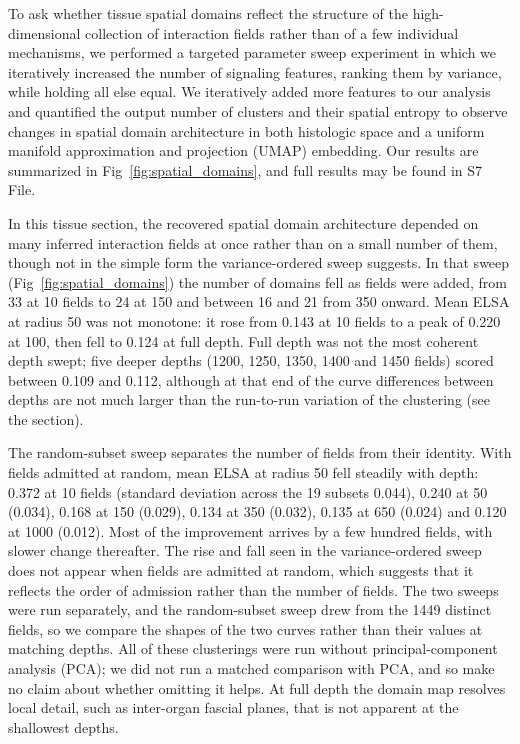\documentclass[10pt,letterpaper]{article}
\begin{document}
To ask whether tissue spatial domains reflect the structure of the high-dimensional collection of interaction fields rather than of a few individual mechanisms, we performed a targeted parameter sweep experiment in which we iteratively increased the number of signaling features, ranking them by variance, while holding all else equal. We iteratively added more features to our analysis and quantified the output number of clusters and their spatial entropy to observe changes in spatial domain architecture in both histologic space and a uniform manifold approximation and projection (UMAP) embedding. Our results are summarized in Fig~\ref{fig:spatial_domains}, and full results may be found in S7 File.

In this tissue section, the recovered spatial domain architecture depended on many inferred interaction fields at once rather than on a small number of them, though not in the simple form the variance-ordered sweep suggests. In that sweep (Fig~\ref{fig:spatial_domains}) the number of domains fell as fields were added, from 33 at 10 fields to 24 at 150 and between 16 and 21 from 350 onward. Mean ELSA at radius 50 was not monotone: it rose from 0.143 at 10 fields to a peak of 0.220 at 100, then fell to 0.124 at full depth. Full depth was not the most coherent depth swept; five deeper depths (1200, 1250, 1350, 1400 and 1450 fields) scored between 0.109 and 0.112, although at that end of the curve differences between depths are not much larger than the run-to-run variation of the clustering (see the  section).

The random-subset sweep separates the number of fields from their identity. With fields admitted at random, mean ELSA at radius 50 fell steadily with depth: 0.372 at 10 fields (standard deviation across the 19 subsets 0.044), 0.240 at 50 (0.034), 0.168 at 150 (0.029), 0.134 at 350 (0.032), 0.135 at 650 (0.024) and 0.120 at 1000 (0.012). Most of the improvement arrives by a few hundred fields, with slower change thereafter. The rise and fall seen in the variance-ordered sweep does not appear when fields are admitted at random, which suggests that it reflects the order of admission rather than the number of fields. The two sweeps were run separately, and the random-subset sweep drew from the 1449 distinct fields, so we compare the shapes of the two curves rather than their values at matching depths. All of these clusterings were run without principal-component analysis (PCA); we did not run a matched comparison with PCA, and so make no claim about whether omitting it helps. At full depth the domain map resolves local detail, such as inter-organ fascial planes, that is not apparent at the shallowest depths.
\end{document}
